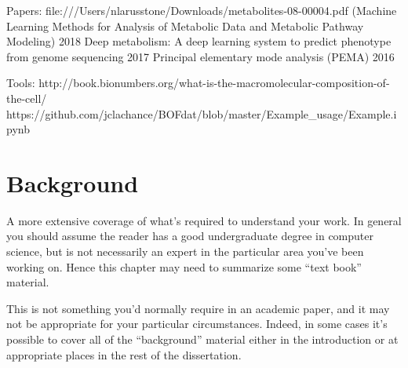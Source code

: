 Papers:
file:///Users/nlarusstone/Downloads/metabolites-08-00004.pdf (Machine Learning Methods for Analysis of Metabolic Data and Metabolic Pathway Modeling) 2018
Deep metabolism: A deep learning system to predict phenotype from genome sequencing 2017
Principal elementary mode analysis (PEMA) 2016

Tools:
http://book.bionumbers.org/what-is-the-macromolecular-composition-of-the-cell/
https://github.com/jclachance/BOFdat/blob/master/Example_usage/Example.ipynb


\chapter{Background} 

A more extensive coverage of what's required to understand your 
work. In general you should assume the reader has a good undergraduate 
degree in computer science, but is not necessarily an expert in 
the particular area you've been working on. Hence this chapter 
may need to summarize some ``text book'' material. 

This is not something you'd normally require in an academic paper, 
and it may not be appropriate for your particular circumstances. 
Indeed, in some cases it's possible to cover all of the ``background'' 
material either in the introduction or at appropriate places in 
the rest of the dissertation. 